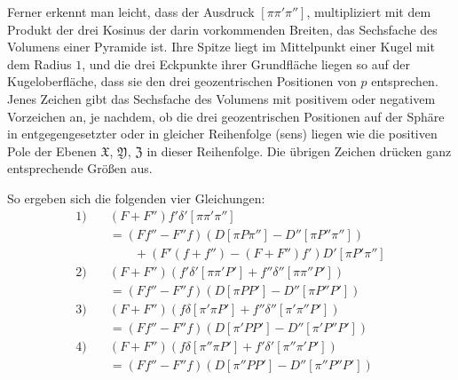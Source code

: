 Ferner erkennt man leicht, dass der Ausdruck $[\pi\pi'\pi'']$, multipliziert mit dem Produkt der drei Kosinus der darin vorkommenden Breiten, das Sechsfache des Volumens einer Pyramide ist. Ihre Spitze liegt im Mittelpunkt einer Kugel mit dem Radius $1$, und die drei Eckpunkte ihrer Grundfläche liegen so auf der Kugeloberfläche, dass sie den drei geozentrischen Positionen von $p$ entsprechen. Jenes Zeichen gibt das Sechsfache des Volumens mit positivem oder negativem Vorzeichen an, je nachdem, ob die drei geozentrischen Positionen auf der Sphäre in entgegengesetzter oder in gleicher Reihenfolge (sens) liegen wie die positiven Pole der Ebenen $\mathfrak{X}$, $\mathfrak{Y}$, $\mathfrak{Z}$ in dieser Reihenfolge. Die übrigen Zeichen drücken ganz entsprechende Größen aus.

So ergeben sich die folgenden vier Gleichungen:
\[
\begin{aligned}
1)\quad &(F+F'')f'\delta'[\pi\pi'\pi'']\\
&=(Ff''-F''f)(D[\pi P\pi'']-D''[\pi P''\pi''])\\
&\qquad+(F'(f+f'')-(F+F'')f')D'[\pi P'\pi'']\\
2)\quad &(F+F'')(f'\delta'[\pi\pi'P']+f''\delta''[\pi\pi''P'])\\
&=(Ff''-F''f)(D[\pi PP']-D''[\pi P''P'])\\
3)\quad &(F+F'')(f\delta[\pi'\pi P']+f''\delta''[\pi'\pi''P'])\\
&=(Ff''-F''f)(D[\pi'PP']-D''[\pi'P''P'])\\
4)\quad &(F+F'')(f\delta[\pi''\pi P']+f'\delta'[\pi''\pi'P'])\\
&=(Ff''-F''f)(D[\pi''PP']-D''[\pi''P''P'])
\end{aligned}
\]


